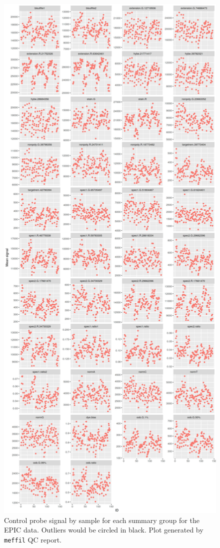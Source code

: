 \documentclass[
]{book}
\begin{document}
\begin{figure}

{\centering \includegraphics[width=0.8\linewidth]{figs/MAVIDOSqcEPICctrlProbes} 

}

\caption{Control probe signal by sample for each summary group for the EPIC data. Outliers would be circled in black. Plot generated by \texttt{meffil} QC report.}\label{fig:MAVIDOSqcEPICctrlProbes}
\end{figure}
\end{document}
